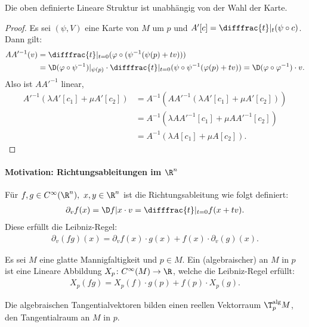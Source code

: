 \begin{lemma}
  Die oben definierte Lineare Struktur ist unabhängig von der Wahl der Karte.
\end{lemma}

\begin{proof}
  Es sei $(\psi, V)$ eine Karte von $M$ um $p$ und $A'[c] = \difffrac{t}|_t(\psi \circ c)$. Dann gilt:
  \begin{align*}
    A A'^{-1}(v) & = \difffrac{t}|_{t=0}(\varphi \circ (\psi^{-1} (\psi(p) + tv)))\\
    & = \D(\varphi \circ \psi^{-1})|_{\psi(p)} \cdot \difffrac{t}|_{t=0}(\psi \circ \psi^{-1}(\varphi(p) + tv)) = \D (\varphi \circ \varphi^{-1}) \cdot v.
  \end{align*}
  Also ist $A A'^{-1}$ linear,
  \begin{align*}
    A'^{-1}(\lambda A'[c_1] + \mu A'[c_2]) & = A^{-1}(A A'^{-1}(\lambda A'[c_1] + \mu A'[c_2]))\\
    & = A^{-1} (\lambda A A'^{-1}[c_1] + \mu A A'^{-1} [c_2])\\
    & = A^{-1}(\lambda A [c_1] + \mu A [c_2]).
  \end{align*}
\end{proof}



\begin{bem}
  \paragraph{Motivation: Richtungsableitungen im $\R^n$}\hfill

  Für $f,g \in C^{\infty}(\R^n), \ x,y \in \R^n$ ist die Richtungsableitung wie folgt definiert:
  \begin{align*}
    \partial_vf(x) = \D f|x \cdot v = \difffrac{t}|_{t=0}f(x+tv).
  \end{align*}
  Diese erfüllt die Leibniz-Regel:
  \begin{align*}
    \partial_v(fg)(x) = \partial_vf(x)\cdot g(x) + f(x) \cdot \partial_v(g)(x).
  \end{align*}
\end{bem}

\begin{dfn}
  Es sei $M$ eine glatte Mannigfaltigkeit und $p\in M$. Ein (algebraischer)  an $M$ in $p$ ist eine Lineare Abbildung $X_p \colon C^{\infty}(M) \to \R$, welche die Leibniz-Regel erfüllt:
  \begin{align*}
    X_p(fg) = X_p(f) \cdot g(p) + f(p) \cdot X_p(g).
  \end{align*}

  Die algebraischen Tangentialvektoren bilden einen reellen Vektorraum $\T_p^{\text{alg}}M$, den Tangentialraum an $M$ in $p$.
\end{dfn}

